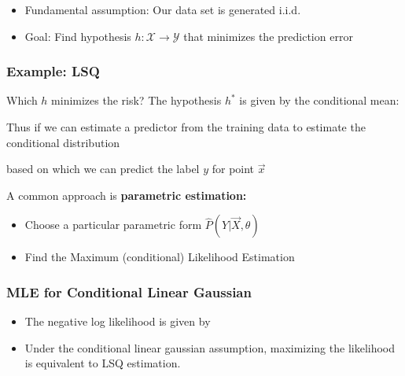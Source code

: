 \documentclass[10pt,a4paper]{scrartcl}
\newcommand{\Argmax}[2]{\text{arg}\underset{#1}{\max}\left(#2\right)}
\begin{document}
\begin{multicols*}{2}
\begin{itemize}
\item Fundamental assumption: Our data set is generated i.i.d.
\item Goal: Find hypothesis $h:\mathcal{X}\rightarrow\mathcal{Y}$ that minimizes the prediction error

\end{itemize}

\subsubsection{Example: LSQ}


Which $h$ minimizes the risk? The hypothesis $h^\ast$ is given by the conditional mean:


Thus if we can estimate a predictor from the training data to estimate the conditional distribution


based on which we can predict the label $y$ for point $\vec{x}$


A common approach is \textbf{parametric estimation:}

\begin{itemize}
\item Choose a particular parametric form $\hat{P}(Y|\vec{X},\theta)$
\item Find the Maximum (conditional) Likelihood Estimation

\mportant{$\theta^\ast=\Argmax{\theta}{\hat{P}(y_1,\ldots,y_n|\vec{x}_1,\ldots,\vec{x}_n,\theta)}$}
\end{itemize}

\subsubsection{MLE for Conditional Linear Gaussian}

\begin{itemize}
\item The negative log likelihood is given by
\item Under the conditional linear gaussian assumption, maximizing the likelihood is equivalent to LSQ estimation.
\end{itemize}


\end{multicols*}
\end{document}
